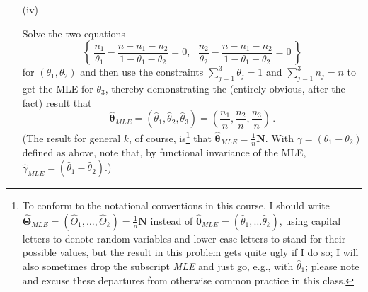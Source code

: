 \documentclass[12pt]{article}
\begin{document}
\begin{itemize}
\begin{itemize}
\begin{itemize}

\item[(iv)]

Solve the two equations
\begin{equation} \label{e:multinomial-8}
\left\{ \ \frac{ n_1 }{ \theta_1 } - \frac{ n - n_1 - n_2 }{ 1 - \theta_1 - \theta_2 } = 0, \ \ \ \frac{ n_2 }{ \theta_2 } - \frac{ n - n_1 - n_2  }{ 1 - \theta_1 - \theta_2 } = 0 \ \right\} 
\end{equation}
for $( \theta_1, \theta_2 )$ and then use the constraints $\sum_{ j = 1 }^3 \theta_j = 1$ and $\sum_{ j = 1 }^3 n_j = n$ to get the MLE for $\theta_3$, thereby demonstrating the (entirely obvious, after the fact) result that
\begin{equation} \label{e:multinomial-9}
\hat{ \bm{ \theta } }_{ MLE } = \left( \hat{ \theta }_1, \hat{ \theta }_2, \hat{ \theta }_3 \right) = \left( \frac{ n_1 }{ n }, \frac{ n_2 }{ n }, \frac{ n_3 }{ n } \right) \, .
\end{equation}
\fbox{\textbf{\textit{[10 points]}}} \vspace*{0.025in} (The result for general $k$, of course, is\footnote{To conform to the notational conventions in this course, I should write $\hat{ \bm{ \Theta } }_{ MLE } = ( \hat{ \Theta }_1, \dots, \hat{ \Theta }_k ) = \frac{ 1 }{ n } \bm{ N }$ instead of $\hat{ \bm{ \theta } }_{ MLE } = ( \hat{ \theta }_1, \dots \hat{ \theta }_k )$, using capital letters to denote random variables and lower-case letters to stand for their possible values, but the result in this problem gets quite ugly if I do so; I will also sometimes drop the subscript \textit{MLE} and just go, e.g., with $\hat{ \theta }_1$; please note and excuse these departures from otherwise common practice in this class.} that $\hat{ \bm{ \theta } }_{ MLE } = \frac{ 1 }{ n } \bm{ N }$. With $\gamma = ( \theta_1 - \theta_2 )$ defined as above, note that, by functional invariance of the MLE, $\hat{ \gamma }_{ MLE } = ( \hat{ \theta }_1 - \hat{ \theta }_2 )$.)


\end{itemize}
\end{itemize}
\end{itemize}
\end{document}
